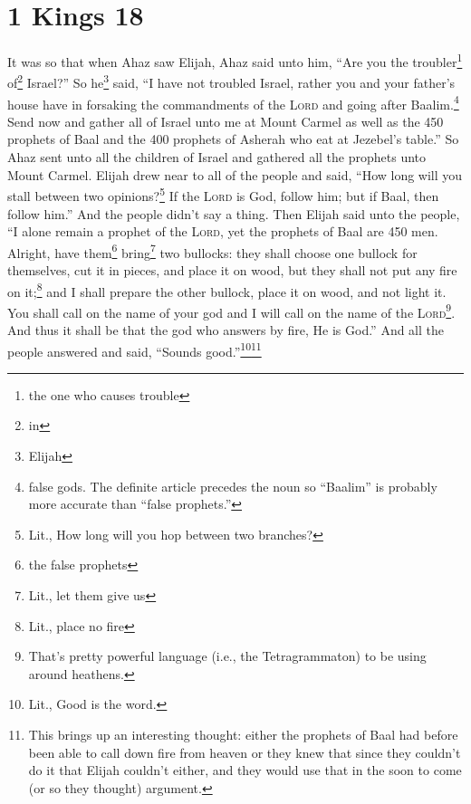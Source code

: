 \section{1 Kings 18}\label{1 Kings 18}
\begin{enumerate}[align=center]
     It was so that when Ahaz saw Elijah, Ahaz said unto him, ``Are you the troubler\footnote{the one who causes trouble} of\footnote{in} Israel?''%
     So he\footnote{Elijah} said, ``I have not troubled Israel, rather you and your father's house have in forsaking the commandments of the \textsc{Lord} and going after Baalim.\footnote{false gods. The definite article precedes the noun so ``Baalim'' is probably more accurate than ``false prophets.''}%
     Send now and gather all of Israel unto me at Mount Carmel as well as the 450 prophets of Baal and the 400 prophets of Asherah who eat at Jezebel's table.''%
     So Ahaz sent unto all the children of Israel and gathered all the prophets unto Mount Carmel.%
     Elijah drew near to all of the people and said, ``How long will you stall between two opinions?\footnote{Lit., How long will you hop between two branches?} If the \textsc{Lord} is God, follow him; but if Baal, then follow him.'' And the people didn't say a thing.%
     Then Elijah said unto the people, ``I alone remain a prophet of the \textsc{Lord}, yet the prophets of Baal are 450 men.%
     Alright, have them\footnote{the false prophets} bring\footnote{Lit., let them give us} two bullocks: they shall choose one bullock for themselves, cut it in pieces, and place it on wood, but they shall not put any fire on it;\footnote{Lit., place no fire} and I shall prepare the other bullock, place it on wood, and not light it.%
     You shall call on the name of your god and I will call on the name of the \textsc{Lord}\footnote{That's pretty powerful language (i.e., the Tetragrammaton) to be using around heathens.}. And thus it shall be that the god who answers by fire, He is God.'' And all the people answered and said, ``Sounds good.''\footnote{Lit., Good is the word.}\footnote{This brings up an interesting thought: either the prophets of Baal had before been able to call down fire from heaven or they knew that since they couldn't do it that Elijah couldn't either, and they would use that in the soon to come (or so they thought) argument.}%

\end{enumerate}
